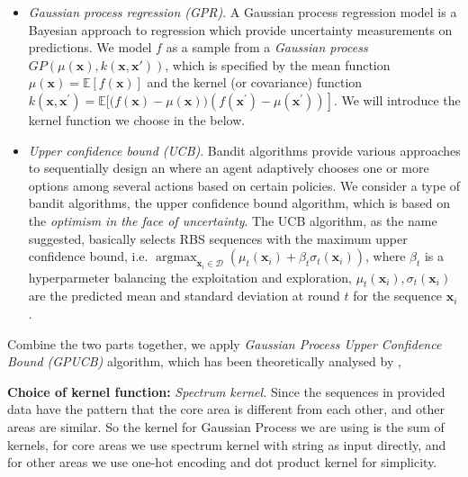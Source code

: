 \begin{itemize}
    \item \textit{Gaussian process regression (GPR)}.
    A Gaussian process regression model \cite{Rasmussen2004} is a Bayesian approach to regression which provide uncertainty measurements on predictions. 
    We model $f$ as a sample from a \textit{Gaussian process} $GP(\mu(\mathbf{x}), k(\mathbf{x}, \mathbf{x'}))$, which is specified by the mean function $\mu(\mathbf{x})=\mathbb{E}[f(\mathbf{x})]$ and the kernel (or covariance) function $k\left(\mathbf{x}, \mathbf{x}^{\prime}\right)=\mathbb{E}[(f(\mathbf{x})-\left.\mu(\mathbf{x}))\left(f\left(\mathbf{x}^{\prime}\right)-\mu\left(\mathbf{x}^{\prime}\right)\right)\right]$. We will introduce the kernel function we choose in the below. 
    
    
    \item \textit{Upper confidence bound (UCB)}. Bandit algorithms \cite{lattimore2018bandit} provide various approaches to sequentially design an where an agent adaptively chooses one or more options among several actions based on certain policies. We consider a type of bandit algorithms, the upper confidence bound algorithm, which is based on the \textit{optimism in the face of uncertainty}. The UCB algorithm, as the name suggested, basically selects RBS sequences with the maximum upper confidence bound, i.e. $\operatorname{argmax}_{\mathbf{x}_i \in \mathcal{D}} \left( \mu_t(\mathbf{x}_i) + \beta_t \sigma_t(\mathbf{x}_i)\right)$,
    where $\beta_t$ is a hyperparmeter balancing the exploitation and exploration, 
    $\mu_t(\mathbf{x}_i), \sigma_t(\mathbf{x}_i)$ are the predicted mean and standard deviation at round $t$ for the sequence $\mathbf{x}_i$. 
\end{itemize}

Combine the two parts together, we apply \textit{Gaussian Process Upper Confidence Bound (GPUCB)} algorithm, which has been theoretically analysed by \textcite{srinivas2012information}, 


\textbf{Choice of kernel function:} \textit{Spectrum kernel.} Since the sequences in provided data have the pattern that the core area is different from each other, and other areas are similar. So the kernel for Gaussian Process we are using is the sum of kernels, for core areas we use spectrum kernel with string as input directly, and for other areas we use one-hot encoding and dot product kernel for simplicity.
